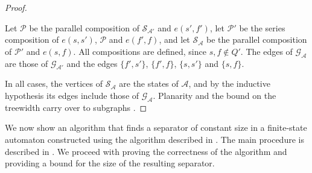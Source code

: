 \begin{proof}
  \begin{case}
    Let $\mathcal{P}$ be the parallel composition of $\mathcal{S}_{\mathcal{A}'}$ and
    $e(s', f')$, let $\mathcal{P}'$ be the series composition of $e(s, s')$, $\mathcal{P}$
    and $e(f', f)$, and let $\mathcal{S}_\mathcal{A}$ be the parallel composition of
    $\mathcal{P}'$ and $e(s, f)$. All compositions are defined, since $s, f \not\in Q'$.
    The edges of $\mathcal{G}_\mathcal{A}$ are those of $\mathcal{G}_{\mathcal{A}'}$ and
    the edges $\{ f', s' \}$, $\{ f', f \}$, $\{ s, s' \}$ and $\{ s, f \}$.
  \end{case}

  \noindent
  In all cases, the vertices of $\mathcal{S}_\mathcal{A}$ are the states of $\mathcal{A}$,
  and by the inductive hypothesis its edges include those of $\mathcal{G}_\mathcal{A}$.
  Planarity and the bound on the treewidth carry over to subgraphs
  \cite{bodlaender_arboretum}.
\end{proof}

We now show an algorithm that finds a separator of constant size in a
finite-state automaton constructed using the algorithm described in
. The main procedure is described in
. We proceed with proving the correctness of the
algorithm and providing a bound for the size of the resulting separator.

